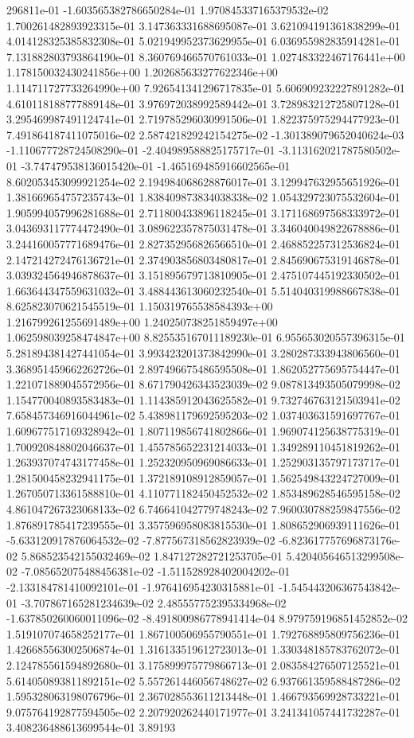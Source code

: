 296811e-01	-1.603565382786650284e-01	1.970845337165379532e-02	1.700261482893923315e-01	3.147363331688695087e-01	3.621094191361838299e-01	4.014128325385832308e-01	5.021949952373629955e-01	6.036955982835914281e-01	7.131882803793864190e-01	8.360769466570761033e-01	1.027483322467176441e+00	1.178150032430241856e+00	1.202685633277622346e+00	1.114711727733264990e+00	7.926541341296717835e-01	5.606909232227891282e-01	4.610118188777889148e-01	3.976972038992589442e-01	3.728983212725807128e-01	3.295469987491124741e-01	2.719785296030991506e-01	1.822375975294477923e-01	7.491864187411075016e-02	2.587421829242154275e-02	-1.301389079652040624e-03	-1.110677728724508290e-01	-2.404989588825175717e-01	-3.113162021787580502e-01	-3.747479538136015420e-01	-1.465169485916602565e-01	8.602053453099921254e-02	2.194984068628876017e-01	3.129947632955651926e-01	1.381669654757235743e-01	1.838409873834038338e-02	1.054329723075532604e-01	1.905994057996281688e-01	2.711800433896118245e-01	3.171168697568333972e-01	3.043693117774472490e-01	3.089622357875031478e-01	3.346040049822678886e-01	3.244160057771689476e-01	2.827352956826566510e-01	2.468852257312536824e-01	2.147214272476136721e-01	2.374903856803480817e-01	2.845690675319146878e-01	3.039324564946878637e-01	3.151895679713810905e-01	2.475107445192330502e-01	1.663644347559631032e-01	3.488443613060232540e-01	5.514040319988667838e-01	8.625823070621545519e-01	1.150319765538584393e+00	1.216799261255691489e+00	1.240250738251859497e+00	1.062598039258474847e+00	8.825535167011189230e-01	6.955653020557396315e-01	5.281894381427441054e-01	3.993423201373842990e-01	3.280287333943806560e-01	3.368951459662262726e-01	2.897496675486595508e-01	1.862052775695754447e-01	1.221071889045572956e-01	8.671790426343523039e-02	9.087813493505079998e-02	1.154770040893583483e-01	1.114385912043625582e-01	9.732746763121503941e-02	7.658457346916044961e-02	5.438981179692595203e-02	1.037403631591697767e-01	1.609677517169328942e-01	1.807119856741802866e-01	1.969074125638775319e-01	1.700920848802046637e-01	1.455785652231214033e-01	1.349289110451819262e-01	1.263937074743177458e-01	1.252320950969086633e-01	1.252903135797173717e-01	1.281500458232941175e-01	1.372189108912859057e-01	1.562549843224727009e-01	1.267050713361588810e-01	4.110771182450452532e-02	1.853489628546595158e-02	4.861047267323068133e-02	6.746641042779748243e-02	7.960030788259847556e-02	1.876891785417239555e-01	3.357596958083815530e-01	1.808652906939111626e-01	-5.633120917876064532e-02	-7.877567318562823939e-02	-6.823617757696873176e-02	5.868523542155032469e-02	1.847127282721253705e-01	5.420405646513299508e-02	-7.085652075488456381e-02	-1.511528928402004202e-01	-2.133184781410092101e-01	-1.976416954230315881e-01	-1.545443206367543842e-01	-3.707867165281234639e-02	2.485557752395334968e-02	-1.637850260060011096e-02	-8.491800986778941414e-04	8.979759196851452852e-02	1.519107074658252177e-01	1.867100506955790551e-01	1.792768895809756236e-01	1.426685563002506874e-01	1.316133519612723013e-01	1.330348185783762072e-01	2.124785561594892680e-01	3.175899975779866713e-01	2.083584276507125521e-01	5.614050893811892151e-02	5.557261446056748627e-02	6.937661359588487286e-02	1.595328063198076796e-01	2.367028553611213448e-01	1.466793569928733221e-01	9.075764192877594505e-02	2.207920262440171977e-01	3.241341057441732287e-01	3.408236488613699544e-01	3.89193